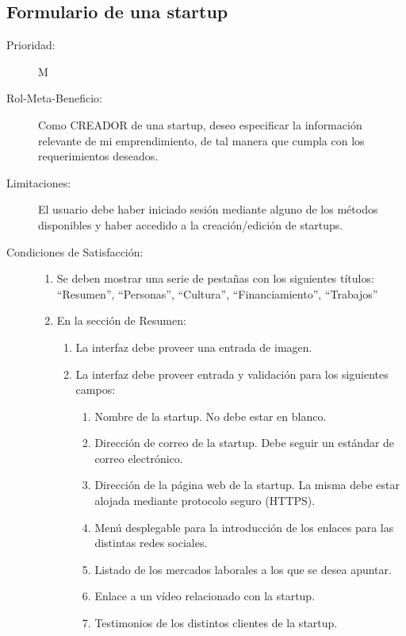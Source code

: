 \newpage


\subsection{Formulario de una startup}

\begin{description}
    \item[Prioridad:] M
    \item[Rol-Meta-Beneficio:] Como CREADOR de una startup, deseo especificar la información relevante de mi emprendimiento, de tal manera que cumpla con los requerimientos deseados.
    \item[Limitaciones:] El usuario debe haber iniciado sesión mediante alguno de los métodos disponibles y haber accedido a la creación/edición de startups.
    \item[Condiciones de Satisfacción:]  \hfill
        \begin{enumerate}
            \item Se deben mostrar una serie de pestañas con los siguientes títulos: “Resumen”, “Personas”, “Cultura”, “Financiamiento”, “Trabajos”
		    \item En la sección de Resumen:
			    \begin{enumerate}
			        \item La interfaz debe proveer una entrada de imagen.
			        \item La interfaz debe proveer entrada y validación para los siguientes campos:
        				\begin{enumerate}
        				    \item Nombre de la startup. No debe estar en blanco.
            				\item Dirección de correo de la startup. Debe seguir un estándar de correo electrónico.
            				\item Dirección de la página web de la startup. La misma debe  estar alojada mediante protocolo seguro (HTTPS).
            				\item Menú desplegable para la introducción de los enlaces para las distintas redes sociales.
            				\item Listado de los mercados laborales a los que se desea apuntar.
            				\item Enlace a un vídeo relacionado con la startup.
            				\item Testimonios de los distintos clientes de la startup.
        				\end{enumerate}
        				

\end{enumerate}
\end{enumerate}
\end{description}
